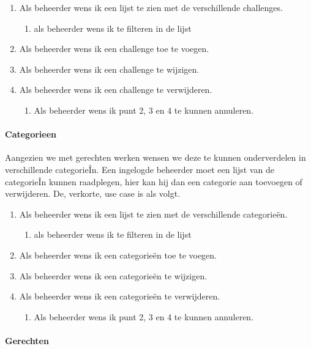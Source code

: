 \begin{enumerate}
	\item Als beheerder wens ik een lijst te zien met de verschillende challenges.
	\begin{enumerate}
		\item als beheerder wens ik te filteren in de lijst
	\end{enumerate}
	\item Als beheerder wens ik een challenge toe te voegen.
	\item Als beheerder wens ik een challenge te wijzigen.
	\item Als beheerder wens ik een challenge te verwijderen.
	\begin{enumerate}
		\item Als beheerder wens ik punt 2, 3 en 4 te kunnen annuleren.
	\end{enumerate}
\end{enumerate}


\paragraph{Categorieen}

Aangezien we met gerechten werken wensen we deze te kunnen onderverdelen in verschillende
categorieÎn. Een ingelogde beheerder moet een lijst van de categorieÎn kunnen raadplegen,
hier kan hij dan een categorie aan toevoegen of verwijderen. De, verkorte, use case is als
volgt.

\begin{enumerate}
	\item Als beheerder wens ik een lijst te zien met de verschillende categorieën.
	\begin{enumerate}
		\item als beheerder wens ik te filteren in de lijst
	\end{enumerate}
	\item Als beheerder wens ik een categorieën toe te voegen.
	\item Als beheerder wens ik een categorieën te wijzigen.
	\item Als beheerder wens ik een categorieën te verwijderen.
	\begin{enumerate}
		\item Als beheerder wens ik punt 2, 3 en 4 te kunnen annuleren.
	\end{enumerate}
\end{enumerate}

\paragraph{Gerechten}

